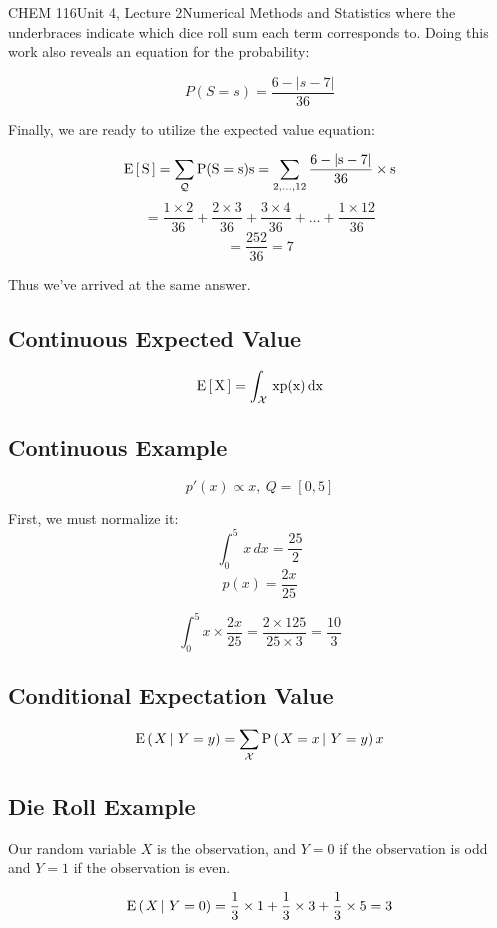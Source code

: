\documentclass{article}
\begin{document}
\begin{tdoc}{CHEM 116}{Unit 4, Lecture 2}{Numerical Methods and Statistics}
where the underbraces indicate which dice roll sum each term corresponds
to. Doing this work also reveals an equation for the probability:

\[
P(S = s) = \frac{6 - |s - 7|}{36}
\]

Finally, we are ready to utilize the expected value equation:

\[
\rm{E}\left[\,S\,\right] = \sum_\mathcal{Q} P(S=s)s = \sum_{2,\ldots,12} \frac{6 - |s - 7|}{36}\times s 
\]
\[
= \frac{1 \times 2}{36} + \frac{2 \times 3}{36} + \frac{3 \times 4}{36} + \ldots + \frac{1 \times 12}{36} 
\]
\[
= \frac{252}{36} = 7
\]

Thus we've arrived at the same answer. 

\subsection{Continuous Expected Value}

\begin{equation}
\rm{E}\left[\,X\,\right] = \int_\mathcal{X}\,xp(x)\,dx
\end{equation}


\subsection{Continuous Example}
\[
p'(x) \propto x,\:  Q = [0,5]
\]

First, we must normalize it:
\[
\int_0^5 \,x\,dx = \frac{25}{2}
\]
\[
p(x) = \frac{2x}{25}
\]

\[
\int_0^5 x\times\frac{2x}{25} = \frac{2\times 125}{25\times 3} = \frac{10}{3}
\]

\subsection{Conditional Expectation Value}
\begin{equation}
\operatorname{E} \left( \left.X \, \right| \,Y=y \right) = \sum_\mathcal{X} \textrm{P} \left( \left.X=x \, \right| \,Y=y \right)x
\end{equation}

\subsection{Die Roll Example}

Our random variable $X$ is the observation, and $Y = 0$ if the observation is odd and $Y = 1$ if the observation is even.

\[
\operatorname{E} \left( \left.X \, \right| \,Y=0 \right) = \frac{1}{3}\times{}1 + \frac{1}{3}\times{}3 + \frac{1}{3}\times{}5 = 3
\]


\end{tdoc}
\end{document}
